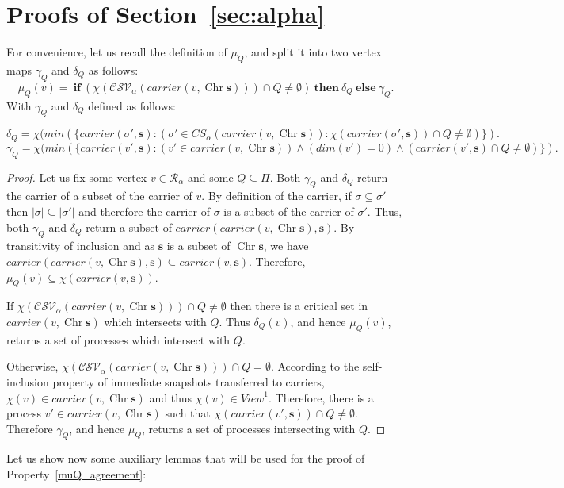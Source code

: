 \documentclass[a4paper]{article}
\def\R{\ensuremath{\mathcal{R}}}
\def\s {\mathbf{s}}
\def\Chr{\operatorname{Chr}}
\def\Car{\mathit{carrier}}
\begin{document}
\section{Proofs of Section~\ref{sec:alpha}}

For convenience, let us recall the definition of $\mu_Q$, and split it into two vertex maps $\gamma_Q$ and $\delta_Q$ as follows:
\[
\mu_Q(v) = \mathbf{\ if\ } (\chi(\mathcal{CSV}_\alpha(\Car(v,\Chr\s)))\cap Q\neq \emptyset)
\mathbf{\ then\ } \delta_Q
\mathbf{\ else\ } \gamma_Q{}. 
\]
With $\gamma_Q$ and $\delta_Q$ defined as follows:
\begin{small}
\[\delta_Q=\chi(min(\{\Car(\sigma',\s): (\sigma'\in CS_\alpha(\Car(v,\Chr\s)): \chi(\Car(\sigma',\s))\cap Q\neq\emptyset)\}){}.\]
\[\gamma_Q = \chi(\mathit{min}(\{\Car(v',\s): 
(v'\in \Car(v,\Chr\s))\wedge(\mathit{dim}(v')=0)\wedge(\Car(v',\s)\cap Q\neq\emptyset)\}){}.\]
\label{Appendix:alphaSim}
\end{small}

\muQVal*

\begin{proof}
Let us fix some vertex $v\in\R_\alpha$ and some $Q\subseteq\Pi$.
Both $\gamma_Q$ and $\delta_Q$ return the carrier of a subset of the carrier of $v$. 
By definition of the carrier, if $\sigma\subseteq\sigma'$ then $|\sigma|\subseteq |\sigma'|$ and
therefore the carrier of $\sigma$ is a subset of the carrier of $\sigma'$.
Thus, both $\gamma_Q$ and $\delta_Q$ return a subset of $\Car(\Car(v,\Chr\s),\s)$.
By transitivity of inclusion and as $\s$ is a subset of $\Chr\s$,
we have $\Car(\Car(v,\Chr\s),\s)\subseteq\Car(v,\s)$. 
Therefore, $\mu_Q(v)\subseteq\chi(\Car(v,\s))$.

If $\chi(\mathcal{CSV}_\alpha(\Car(v,\Chr\s)))\cap Q\neq \emptyset$ then there is 
a critical set in $\Car(v,\Chr\s)$ which intersects with $Q$. 
Thus $\delta_Q(v)$, and hence $\mu_Q(v)$, returns a set of processes which intersect with $Q$.

Otherwise, $\chi(\mathcal{CSV}_\alpha(\Car(v,\Chr\s)))\cap Q= \emptyset$.
According to the self-inclusion property of immediate snapshots transferred to 
carriers, $\chi(v)\in\Car(v,\Chr\s)$ and thus $\chi(v)\in\mathit{View}^1$. 
Therefore, there is a process $v'\in\Car(v,\Chr\s)$ 
such that $\chi(\Car(v',\s))\cap Q\neq \emptyset$. Therefore $\gamma_Q$, and hence
$\mu_Q$, returns a set of processes intersecting with $Q$.
\end{proof}

Let us show now some auxiliary lemmas that will be used for the proof of Property~\ref{muQ_agreement}:
\end{document}
